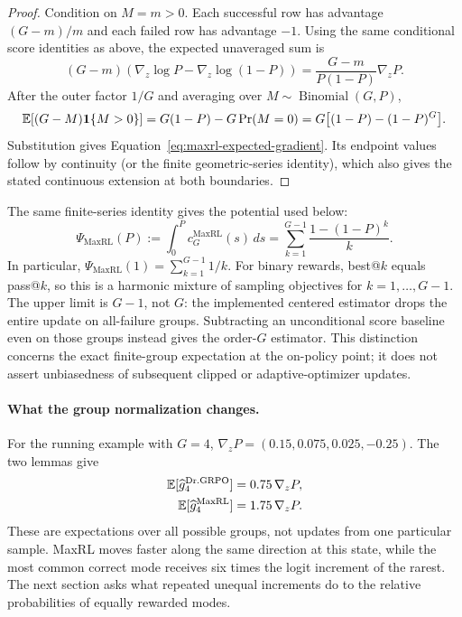 \begin{proof}
Condition on $M=m>0$. Each successful row has advantage $(G-m)/m$ and each
failed row has advantage $-1$. Using the same conditional score identities as
above, the expected unaveraged sum is
\[
  (G-m)\!\left(\nabla_z\log P-\nabla_z\log(1-P)\right)
  =\frac{G-m}{P(1-P)}\nabla_zP.
\]
After the outer factor $1/G$ and averaging over
$M\sim\operatorname{Binomial}(G,P)$,
\[
 \mathbb E[(G-M)\mathbf 1\{M>0\}]
 =G(1-P)-G\Pr(M=0)
 =G\big[(1-P)-(1-P)^G\big].
\]
Substitution gives Equation~\eqref{eq:maxrl-expected-gradient}. Its endpoint
values follow by continuity (or the finite geometric-series identity), which
also gives the stated continuous extension at both boundaries.
\end{proof}

The same finite-series identity gives the potential used below:
\begin{equation}
 \Psi_{\mathrm{MaxRL}}(P)
 :=\int_0^P c_G^{\mathrm{MaxRL}}(s)\,ds
 =\sum_{k=1}^{G-1}\frac{1-(1-P)^k}{k}.
 \label{eq:maxrl-potential-finite-sum}
\end{equation}
In particular, $\Psi_{\mathrm{MaxRL}}(1)=\sum_{k=1}^{G-1}1/k$.
For binary rewards, best@\(k\) equals pass@\(k\), so this is a harmonic
mixture of sampling objectives for $k=1,\ldots,G-1$. The upper limit is
$G-1$, not $G$: the implemented centered estimator drops the entire update
on all-failure groups. Subtracting an unconditional score baseline even on
those groups instead gives the order-$G$ estimator. This distinction concerns
the exact finite-group expectation at the on-policy point; it does not assert
unbiasedness of subsequent clipped or adaptive-optimizer updates.

\paragraph{What the group normalization changes.}
For the running example with $G=4$,
$\nabla_zP=(0.15,0.075,0.025,-0.25)$. The two lemmas give
\[
 \begin{aligned}
 \mathbb E[\widehat g_4^{\rm Dr.GRPO}]&=0.75\,\nabla_zP,\\
 \mathbb E[\widehat g_4^{\rm MaxRL}]&=1.75\,\nabla_zP.
 \end{aligned}
\]
These are expectations over all possible groups, not updates from one
particular sample. MaxRL moves faster along the same direction at this
state, while the most common correct mode receives six times the logit
increment of the rarest. The next section asks what repeated unequal
increments do to the relative probabilities of equally rewarded modes.


